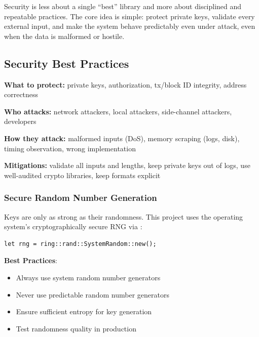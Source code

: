 Security is less about a single ``best'' library and more about disciplined and repeatable practices. The core idea is simple: protect private keys, validate every external input, and make the system behave predictably even under attack, even when the data is malformed or hostile.

\subsection{Security Best Practices}
\label{sec:ch08-security-practices}

\begin{warnbox}
\textbf{What to protect:} private keys, authorization, tx/block ID integrity, address correctness

\noindent
\textbf{Who attacks:} network attackers, local attackers, side-channel attackers, developers

\noindent
\textbf{How they attack:} malformed inputs (DoS), memory scraping (logs, disk), timing observation, wrong implementation

\noindent
\textbf{Mitigations:} validate all inputs and lengths, keep private keys out of logs, use well-audited crypto libraries, keep formats explicit
\end{warnbox}

\subsubsection{Secure Random Number Generation}
\label{sec:ch08-secure-rng}

Keys are only as strong as their randomness. This project uses the operating system's cryptographically secure RNG via :

\begin{verbatim}
let rng = ring::rand::SystemRandom::new();
\end{verbatim}

\textbf{Best Practices}:
\begin{itemize}
  \item Always use system random number generators
  \item Never use predictable random number generators
  \item Ensure sufficient entropy for key generation
  \item Test randomness quality in production
\end{itemize}

